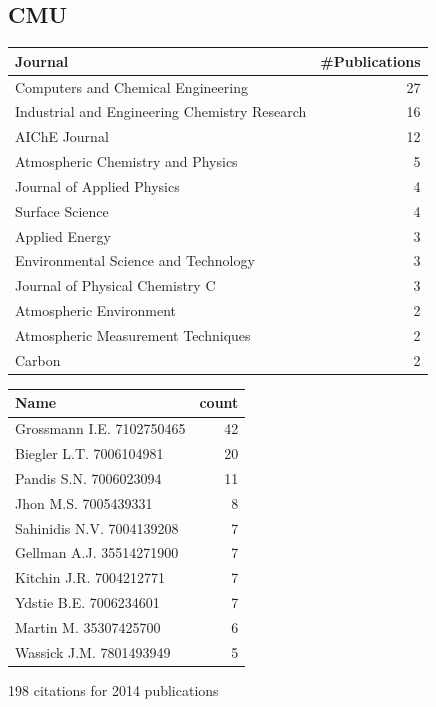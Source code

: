\documentclass[11pt]{article}
\begin{document}
\subsection{CMU}
\label{sec-1-14}
\begin{center}
\begin{tabular}{lr}
Journal & \#Publications\\
\hline
Computers and Chemical Engineering & 27\\
Industrial and Engineering Chemistry Research & 16\\
AIChE Journal & 12\\
Atmospheric Chemistry and Physics & 5\\
Journal of Applied Physics & 4\\
Surface Science & 4\\
Applied Energy & 3\\
Environmental Science and Technology & 3\\
Journal of Physical Chemistry C & 3\\
Atmospheric Environment & 2\\
Atmospheric Measurement Techniques & 2\\
Carbon & 2\\
\end{tabular}
\end{center}

\begin{center}
\begin{tabular}{lr}
Name & count\\
\hline
Grossmann I.E. 7102750465 & 42\\
Biegler L.T. 7006104981 & 20\\
Pandis S.N. 7006023094 & 11\\
Jhon M.S. 7005439331 & 8\\
Sahinidis N.V. 7004139208 & 7\\
Gellman A.J. 35514271900 & 7\\
Kitchin J.R. 7004212771 & 7\\
Ydstie B.E. 7006234601 & 7\\
Martin M. 35307425700 & 6\\
Wassick J.M. 7801493949 & 5\\
\end{tabular}
\end{center}

198 citations for 2014 publications
\end{document}
